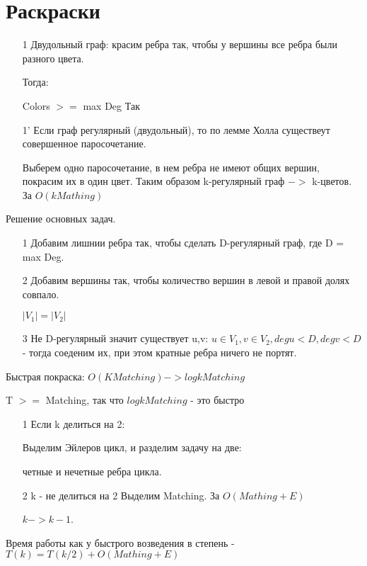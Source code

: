\section{Раскраски}


\begin{itemize}

\item[1] 
Двудольный граф: красим ребра так, чтобы у вершины все ребра были разного цвета.

 Тогда:

Colors $>=$ max Deg Так 
\item[1'] 
Если граф регулярный (двудольный), то по лемме Холла существеут совершенное паросочетание.

Выберем одно паросочетание, в нем ребра не имеют общих вершин, покрасим их в один цвет. Таким образом k-регулярный граф $->$ k-цветов. За $O(k Mathing)$
\end{itemize}


Решение основных задач.
\begin{itemize}
\item[1] 
Добавим лишнии ребра так, чтобы сделать D-регулярный граф, где D = max Deg.
\item[2] 
Добавим вершины так, чтобы количество вершин в левой и правой долях совпало.

$|V_1| = |V_2|$
\item[3]
Не D-регулярный значит существует u,v: $u \in V_1, v \in V_2, deg u < D, deg v < D$ - тогда соеденим их, при этом кратные ребра ничего не портят.
\end{itemize}

Быстрая покраска: $O(K Matching) - > log{k} Matching$
\begin{Rem}
T $>=$ Matching, так что $ log{k} Matching$ - это быстро
\end{Rem}

\begin{itemize}
\item[1] 
Если k делиться на 2:

Выделим Эйлеров цикл, и разделим задачу на две:

четные и нечетные ребра цикла.
\item[2] 
k - не делиться на 2
Выделим Matching. За $O(Mathing + E)$

$k -> k-1$.
\end{itemize}

Время работы как у быстрого возведения в степень - $T(k) = T(k/2) + O(Mathing + E)$
 
